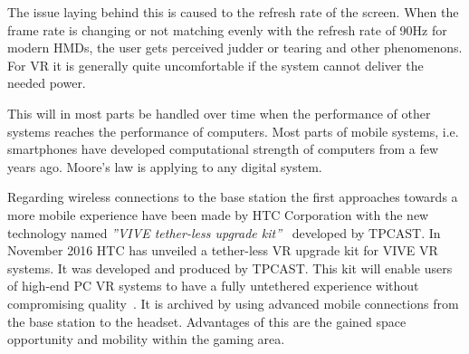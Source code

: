 The issue laying behind this is caused to the refresh rate of the screen. When the frame rate is changing or not matching evenly with the refresh rate of 90Hz for modern HMDs, the user gets perceived judder or tearing and other phenomenons. For VR it is generally quite uncomfortable if the system cannot deliver the needed power.

This will in most parts be handled over time when the performance of other systems reaches the performance of computers. Most parts of mobile systems, i.e. smartphones have developed computational strength of computers from a few years ago. Moore's law is applying to any digital system.

Regarding wireless connections to the base station the first approaches towards a more mobile experience have been made by HTC Corporation with the new technology named \textit{''VIVE tether-less upgrade kit''}~\cite{online:tpCast} developed by TPCAST. \newline
In November 2016 HTC has unveiled a tether-less VR upgrade kit for VIVE VR systems. It was developed and produced by TPCAST. This kit will enable users of high-end PC VR systems to have a fully untethered experience without compromising quality~\cite{online:tpCast}. It is archived by using advanced mobile connections from the base station to the headset.\newline
Advantages of this are the gained space opportunity and mobility within the gaming area.
